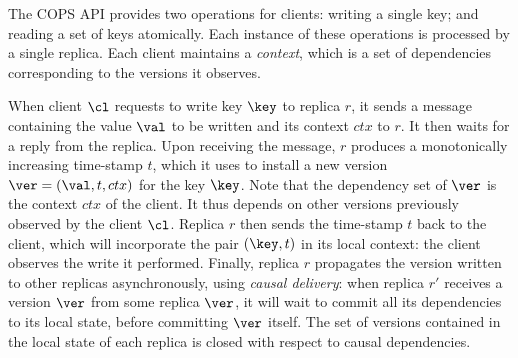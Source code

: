 The COPS API provides two operations for  clients: writing a single
key; and reading 
a set of keys atomically. Each instance of these operations is processed by a single replica. 
Each client maintains a \emph{context}, which is a set of dependencies
corresponding to the versions it observes.  

When client $\cl$ requests to write key $\key$ to replica $r$, it
sends a message containing the value $\val$ to be written and its
context $ctx$ to $r$. It then waits for a reply from the replica. 
Upon receiving the message, $r$ produces a monotonically increasing time-stamp $t$, which it uses to install a new version $\ver = (\val, t, ctx)$ for the key $\key$. 
Note that the dependency set of $\ver$ is the context $ctx$ of the client.
It thus  depends on other versions previously observed by the client $\cl$. 
Replica $r$ then sends the time-stamp $t$ back to the client, which will incorporate the pair $(\key, t)$ in its local context: 
the client observes the write it performed. Finally, replica $r$ propagates the version written to other replicas asynchronously, 
using \emph{causal delivery}: when replica $r'$ receives a version $\ver$ from some replica $\ver$, it 
will wait to commit all its dependencies to its local state, before committing $\ver$ itself.
The set of versions contained in the local state of each replica is closed with respect to causal dependencies.
